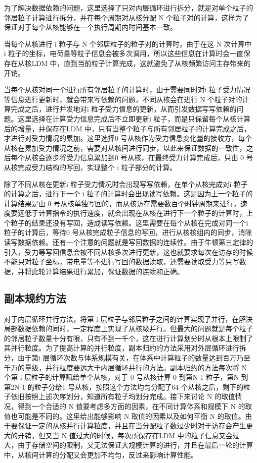 为了解决数据依赖的问题，这里选择了只对内层循环进行拆分，就是对单个粒子的邻居粒子计算进行拆分，并在每个周期对从核分配 N 个粒子对的计算，这样为了保证对于每个从核能够在一个执行周期内时间基本一致。

当每个从核进行 i 粒子与 N 个邻居粒子的粒子对的计算时，由于在这 N 次计算中i 粒子的坐标，电荷量等粒子信息会被多次调用，所以这些信息在计算时会一直保存在从核LDM 中，直到当前粒子计算完成，这就避免了从核频繁访问主存带来的开销。

当每个从核对同一个进行所有邻居粒子的计算时，由于需要同时对i 粒子受力情况等信息进行更新时，就会带来写依赖的问题，不同从核会在进行 N 个粒子对的计算完成之后，进行并发地对i 粒子受力信息的更新，从而引发数据写写依赖的问题。这里选择在计算受力信息完成后不立即更新i 粒子，而是只保留每个从核计算后的增量，并保存在LDM 中，只有当整个粒子与所有邻居粒子的计算完成之后，才进行对受力情况的累加。这里选择0 号从核作为受力信息变化量的接收方，每个从核在累加受力情况之前，需要对从核间进行同步，以此来保证数据的一致性，之后每个从核会逐步将受力信息累加到0 号从核，在最终受力计算完成后，只由 0 号从核完成受力结构的写回，实现整个 i 粒子部分的计算。

除了不同从核在更新i 粒子受力情况时会出现写写依赖，在单个从核完成对i 粒子的计算之后，进行下一个 i 粒子的计算时会出现读写依赖。这是因为上一个粒子的计算结果是由 0 号从核单独写回的，而从核访存需要数百个时钟周期来进行，速度要远低于计算指令的执行速度，就会出现在从核在进行下一个粒子的计算时，上个粒子的结果还没有写回，造成读写依赖。这里需要在每个从核在完成对同一个i 粒子的计算后，等待0 号从核完成粒子信息的写回，进行从核核组内的同步，消除读写数据依赖。还有一个注意的问题就是写回数据的连续性。由于牛顿第三定律的引入，受力等写回信息会被不同从核多次进行更新，这也就要求每次在访存的时候不能只对粒子坐标，带电量等不进行写回的数据读取，还需要读取受力等只写数据，并将此轮计算结果进行累加，保证数据的连续和正确。

\subsection{副本规约方法}
对于内层循环并行方法，将第 i 层粒子与邻居粒子之间的计算实现了并行，在解决局部数据依赖的同时，一定程度上实现了从核级并行。但最大的问题就是每个粒子的邻居粒子数量十分有限，只有不到一千个，这在进行计算划分时从根本上限制了其并行粒度。为了提高计算的并行粒度，副本归约的方法采用对外层循环进行拆分，由于第i 层循环次数与体系规模有关，在体系中计算粒子的数量达到百万乃至千万的量级，并行粒度要远大于内层循环并行的方法。副本归约的方法每次将 N 个第 i 层粒子的计算赋给单个从核，对于 0 号从核计算 0 到第N-1 粒子，第N 到第2N-1 的粒子分给1 号从核，按照这个方法均匀分配了64 个从核之后，剩下的粒子依旧按照上述次序划分，知道所有粒子均划分完成。接下来讨论 N 的取值情况，得到一个合适的 N 值要考虑多方面的因素，在不同计算体系和规模下 N 的取值也可能是不同的。这里给出能够影响 N 取值的因素以及如何平衡 N 的取值。由于要保证一定的从核并行计算粒度，并且在当分配粒子数过少时对于访存会产生更大的开销，但又当 N 值过大的时候，每次所保存在LDM 中的粒子信息又会过大，由于存储空间的限制，又无法保证大规模计算的进行，并且在最后一轮的计算中，从核间计算的分配又会更加不均匀，反过来影响计算性能。

